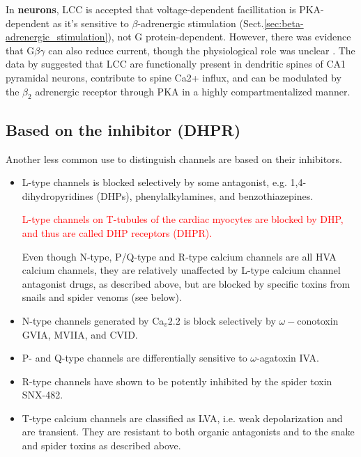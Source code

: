 In {\bf neurons}, LCC is accepted that voltage-dependent facillitation is
PKA-dependent as it's sensitive to $\beta$-adrenergic stimulation
\citep{hadley1991} (Sect.\ref{sec:beta-adrenergic_stimulation}), not G
protein-dependent.
However, there was evidence that G$\beta\gamma$ can also reduce current, though
the physiological role was unclear \citep{ivanina2000}.
The data by \citep{hoogland2004} suggested that LCC are functionally present in
dendritic spines of CA1 pyramidal neurons, contribute to spine Ca2+ influx, and
can be modulated by the $\beta_2$ adrenergic receptor through PKA in a highly
compartmentalized manner.




\subsection{Based on the inhibitor (DHPR)}
\label{sec:DHPR-Ca2+channel}

Another less common use to distinguish  channels are based
on their inhibitors. 
\begin{itemize}
\item L-type  channels is blocked selectively by some
  antagonist, e.g.  1,4-dihydropyridines (DHPs), phenylalkylamines,
  and benzothiazepines.  
  
  \textcolor{red}{L-type channels on T-tubules of the cardiac
  myocytes are blocked by DHP, and thus are called DHP receptors
  (DHPR).}

  Even though N-type, P/Q-type and R-type calcium channels are all
  HVA calcium channels, they are relatively unaffected by L-type calcium channel
  antagonist drugs, as described above, but are blocked by specific toxins from
  snails and spider venoms (see below).

  \item N-type   channels generated by Ca$_v2.2$ is block selectively
by $\omega-$conotoxin GVIA, MVIIA, and CVID.

  \item P- and Q-type channels are differentially sensitive to $\omega$-agatoxin
IVA.
  
  \item R-type channels have shown to be potently inhibited by the spider toxin
  SNX-482.
  
\item T-type calcium channels are classified as LVA, i.e. weak
  depolarization and are transient. They are resistant to both organic
  antagonists and to the snake and spider toxins as described above.

\end{itemize}

